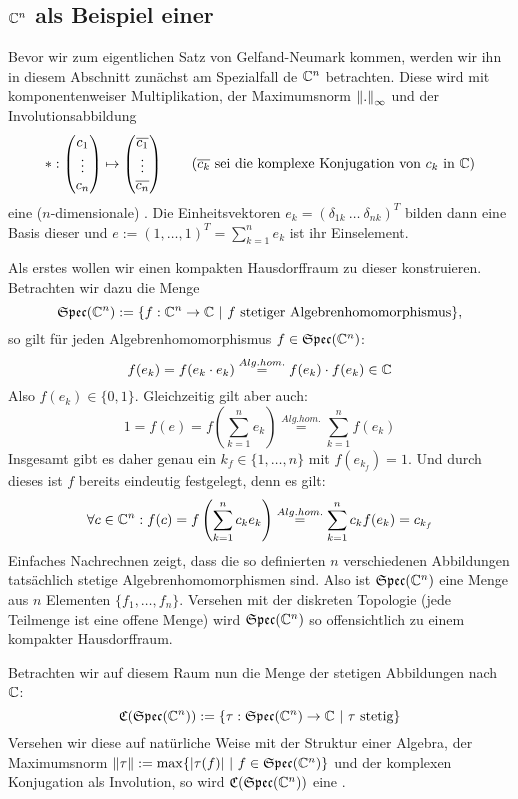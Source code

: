 \subsection{$\mathbb{C}^n$ als Beispiel einer \CAlg}\label{sec:BeispielCn}

Bevor wir zum eigentlichen Satz von Gelfand-Neumark kommen, werden wir ihn in diesem Abschnitt zunächst am Spezialfall de \CAlg{} $\mathbb{C}^n$ betrachten. Diese wird mit komponentenweiser Multiplikation, der Maximumsnorm $\left\lVert.\right\rVert_\infty$ und der Involutionsabbildung
\[*: 
\left(\begin{matrix}
 c_1 \\ \vdots \\ c_n 
\end{matrix}\right)
\mapsto 
\left(\begin{matrix}
\overline{c_1} \\ \vdots \\ \overline{c_n}
\end{matrix}\right) \qquad (\overline{c_k} \text{ sei die komplexe Konjugation von } c_k  \text{ in } \mathbb{C})\]
eine ($n$-dimensionale) \CAlg{}. Die Einheitsvektoren $e_k = \left( \delta_{1k} \  \dots \ \delta_{nk} \right)^T$ bilden dann eine Basis dieser \CAlg{} und $e := (1,\dots,1)^T = \sum_{k=1}^ne_k$ ist ihr Einselement.

Als erstes wollen wir einen kompakten Hausdorffraum zu dieser \CAlg{} konstruieren. Betrachten wir dazu die Menge
	\[\mathfrak{Spec}(\mathbb{C}^n) := \{f: \mathbb{C}^n \to \mathbb{C} ~|~ f \text{ stetiger Algebrenhomomorphismus}\},\]
so gilt für jeden Algebrenhomomorphismus $f \in \mathfrak{Spec}(\mathbb{C}^n)$:
	\[f(e_k) = f(e_k \cdot e_k) \overset{Alg.hom.}{=} f(e_k) \cdot f(e_k) \in \mathbb{C}\]
Also $f(e_k) \in \{0, 1\}$. Gleichzeitig gilt aber auch:
	\[1 = f(e) = f\left(\sum_{k=1}^n e_k\right) \overset{Alg.hom.}{=} \sum_{k=1}^n f(e_k)\]
Insgesamt gibt es daher genau ein $k_f \in \{1, \dots, n\}$ mit $f(e_{k_f}) = 1$. Und durch dieses ist $f$ bereits eindeutig festgelegt, denn es gilt:
	\[\forall c \in \mathbb{C}^n: f(c) = f\left(\sum_{k=1}^n c_k e_k\right) \overset{Alg.hom.}{=} \sum_{k=1}^n c_k f(e_k) = c_{k_f} \]
Einfaches Nachrechnen zeigt, dass die so definierten $n$ verschiedenen Abbildungen tatsächlich stetige Algebrenhomomorphismen sind. Also ist $\mathfrak{Spec}(\mathbb{C}^n)$ eine Menge aus $n$ Elementen $\{f_1, \dots, f_n\}$. Versehen mit der diskreten Topologie (jede Teilmenge ist eine offene Menge) wird $\mathfrak{Spec}(\mathbb{C}^n)$ so offensichtlich zu einem kompakter Hausdorffraum.

Betrachten wir auf diesem Raum nun die Menge der stetigen Abbildungen nach $\mathbb{C}$:
	\[\mathfrak{C}(\mathfrak{Spec}(\mathbb{C}^n)) := \{\tau: \mathfrak{Spec}(\mathbb{C}^n) \to \mathbb{C} ~|~ \tau \text{ stetig}\}\]
Versehen wir diese auf natürliche Weise mit der Struktur einer Algebra, der Maximumsnorm $\left\lVert\tau\right\rVert := \max \{|\tau(f)| ~|~ f \in \mathfrak{Spec}(\mathbb{C}^n)\}$ und der komplexen Konjugation als Involution, so wird $\mathfrak{C}(\mathfrak{Spec}(\mathbb{C}^n))$ eine \CAlg. 

